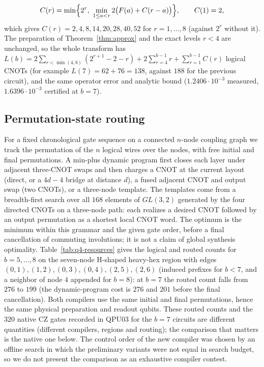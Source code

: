 \documentclass[11pt]{article}
\begin{document}
\begin{equation}\label{eq:crecur}
 C(r)=\min\Bigl\{2^r,\ \min_{1\le a<r}2\bigl(F(a)+C(r-a)\bigr)\Bigr\},\qquad C(1)=2,
\end{equation}
which gives $C(r)=2,4,8,14,20,28,40,52$ for $r=1,\dots,8$ (against $2^r$ without it). The preparation of Theorem~\ref{thm:approx} and the exact levels $r<4$ are unchanged, so the whole transform has $L(b)=2\sum_{r<\min(4,b)}(2^{r+1}-2-r)+2\sum_{r=4}^{b-1}r+\sum_{r=1}^{b-1}C(r)$ logical CNOTs (for example $L(7)=62+76=138$, against $188$ for the previous circuit), and the same operator error and analytic bound ($1.2406\cdot10^{-3}$ measured, $1.6396\cdot10^{-3}$ certified at $b=7$).

\subsection{Permutation-state routing}
For a fixed chronological gate sequence on a connected $n$-node coupling graph we track the permutation of the $n$ logical wires over the nodes, with free initial and final permutations. A min-plus dynamic program first closes each layer under adjacent three-CNOT swaps and then charges a CNOT at the current layout (direct, or a $4d-4$ bridge at distance $d$), a fused adjacent CNOT and output swap (two CNOTs), or a three-node template. The templates come from a breadth-first search over all $168$ elements of $GL(3,2)$ generated by the four directed CNOTs on a three-node path: each realizes a desired CNOT followed by an output permutation as a shortest local CNOT word. The optimum is the minimum within this grammar and the given gate order, before a final cancellation of commuting involutions; it is not a claim of global synthesis optimality. Table~\ref{tab:q4-resources} gives the logical and routed counts for $b=5,\dots,8$ on the seven-node H-shaped heavy-hex region with edges $(0,1),(1,2),(0,3),(0,4),(2,5),(2,6)$ (induced prefixes for $b<7$, and a neighbor of node $4$ appended for $b=8$): at $b=7$ the routed count falls from $276$ to $199$ (the dynamic-program cost is $276$ and $201$ before the final cancellation). Both compilers use the same initial and final permutations, hence the same physical preparation and readout qubits. These routed counts and the $320$ native CZ gates recorded in QPU03 for the $b=7$ circuits are different quantities (different compilers, regions and routing); the comparison that matters is the native one below. The control order of the new compiler was chosen by an offline search in which the preliminary variants were not equal in search budget, so we do not present the comparison as an exhaustive compiler contest.
\end{document}
